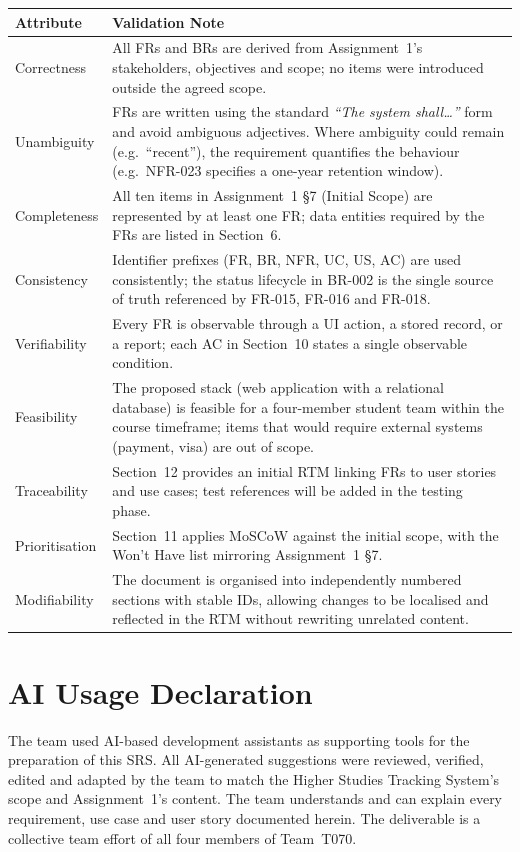 \documentclass[11pt,a4paper]{article}
\begin{document}
\begin{tabularx}{\textwidth}{@{}p{3.6cm} Y@{}}
\toprule
\textbf{Attribute} & \textbf{Validation Note} \\
\midrule
Correctness & All FRs and BRs are derived from Assignment~1's stakeholders, objectives and scope; no items were introduced outside the agreed scope. \\
Unambiguity & FRs are written using the standard \emph{``The system shall\ldots''} form and avoid ambiguous adjectives. Where ambiguity could remain (e.g.\ ``recent''), the requirement quantifies the behaviour (e.g.\ NFR-023 specifies a one-year retention window). \\
Completeness & All ten items in Assignment~1 §7 (Initial Scope) are represented by at least one FR; data entities required by the FRs are listed in Section~6. \\
Consistency & Identifier prefixes (FR, BR, NFR, UC, US, AC) are used consistently; the status lifecycle in BR-002 is the single source of truth referenced by FR-015, FR-016 and FR-018. \\
Verifiability & Every FR is observable through a UI action, a stored record, or a report; each AC in Section~10 states a single observable condition. \\
Feasibility & The proposed stack (web application with a relational database) is feasible for a four-member student team within the course timeframe; items that would require external systems (payment, visa) are out of scope. \\
Traceability & Section~12 provides an initial RTM linking FRs to user stories and use cases; test references will be added in the testing phase. \\
Prioritisation & Section~11 applies MoSCoW against the initial scope, with the Won't Have list mirroring Assignment~1 §7. \\
Modifiability & The document is organised into independently numbered sections with stable IDs, allowing changes to be localised and reflected in the RTM without rewriting unrelated content. \\
\bottomrule
\end{tabularx}

\section*{AI Usage Declaration}
The team used AI-based development assistants as supporting tools for
the preparation of this SRS. All AI-generated suggestions were
reviewed, verified, edited and adapted by the team to match the
Higher Studies Tracking System's scope and Assignment~1's content.
The team understands and can explain every requirement, use case and
user story documented herein. The deliverable is a collective team
effort of all four members of Team~T070.
\end{document}
